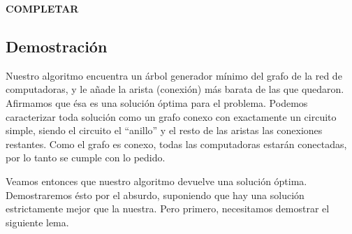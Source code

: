 \textbf{COMPLETAR}

\subsection{Demostración}

Nuestro algoritmo encuentra un árbol generador mínimo del grafo de la red de computadoras, y le añade la arista (conexión) más barata de las que quedaron. Afirmamos que ésa es una solución óptima para el problema. Podemos caracterizar toda solución como un grafo conexo con exactamente un circuito simple, siendo el circuito el ``anillo'' y el resto de las aristas las conexiones restantes. Como el grafo es conexo, todas las computadoras estarán conectadas, por lo tanto se cumple con lo pedido.

Veamos entonces que nuestro algoritmo devuelve una solución óptima. Demostraremos ésto por el absurdo, suponiendo que hay una solución estrictamente mejor que la nuestra. Pero primero, necesitamos demostrar el siguiente lema.

